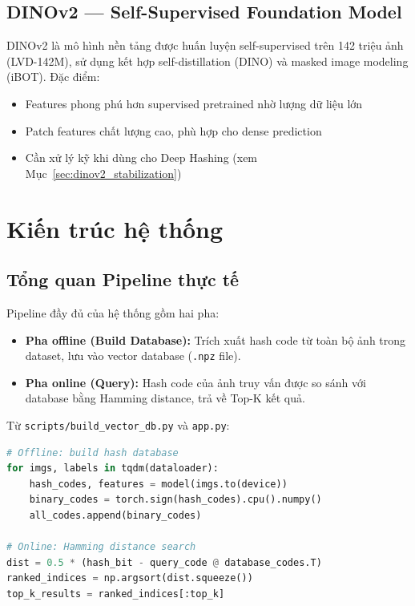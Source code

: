 \documentclass[13pt,a4paper]{article}
\begin{document}
\subsection{DINOv2 --- Self-Supervised Foundation Model}

DINOv2 \cite{oquab2024dinov2} là mô hình nền tảng được huấn luyện self-supervised trên 142 triệu ảnh (LVD-142M), sử dụng kết hợp self-distillation (DINO) và masked image modeling (iBOT). Đặc điểm:

\begin{itemize}
    \item Features phong phú hơn supervised pretrained nhờ lượng dữ liệu lớn
    \item Patch features chất lượng cao, phù hợp cho dense prediction
    \item Cần xử lý kỹ khi dùng cho Deep Hashing (xem Mục~\ref{sec:dinov2_stabilization})
\end{itemize}


\section{Kiến trúc hệ thống}

\subsection{Tổng quan Pipeline thực tế}

Pipeline đầy đủ của hệ thống gồm hai pha:
\begin{itemize}
    \item \textbf{Pha offline (Build Database):} Trích xuất hash code từ toàn bộ ảnh trong dataset, lưu vào vector database (\texttt{.npz} file).
    \item \textbf{Pha online (Query):} Hash code của ảnh truy vấn được so sánh với database bằng Hamming distance, trả về Top-K kết quả.
\end{itemize}

Từ \texttt{scripts/build\_vector\_db.py} và \texttt{app.py}:

\begin{lstlisting}[language=Python, caption={Core pipeline code}]
# Offline: build hash database
for imgs, labels in tqdm(dataloader):
    hash_codes, features = model(imgs.to(device))
    binary_codes = torch.sign(hash_codes).cpu().numpy()
    all_codes.append(binary_codes)

# Online: Hamming distance search
dist = 0.5 * (hash_bit - query_code @ database_codes.T)
ranked_indices = np.argsort(dist.squeeze())
top_k_results = ranked_indices[:top_k]
\end{lstlisting}
\end{document}

